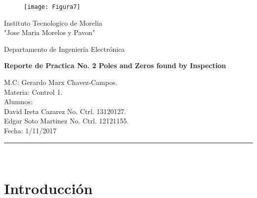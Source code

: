 \documentclass{report}
\newcounter{ns}
\begin{document}
	
	\begin{titlepage}
		
		\begin{center}
			\vspace*{-1in}
			\begin{figure}[htb]
				\begin{center}
					\texttt{[image: Figura7]}
				\end{center}
			\end{figure}
			
		\begin{large}
				Instituto Tecnologico de Morelia\\
				"Jose Maria Morelos y Pavon"\\
		\end{large}
			\vspace*{0.15in}
		\begin{large}
			Departamento de Ingeniería Electrónica\\
		\end{large}
			\vspace*{0.4in}
			
			\begin{Large}
				\textbf{Reporte de Practica No. 2 Poles and Zeros found by Inspection} \\
			\end{Large}
			\vspace*{0.3in}
			\begin{large}
				M.C: Gerardo Marx Chavez-Campos.\\
				Materia: Control 1.\\
				Alumnos:\\
				 		David Ireta Cazarez No. Ctrl. 13120127.\\
						Edgar Soto Martinez No. Ctrl. 12121155.\\
				Fecha: 1/11/2017\\
			\end{large}
			\rule{80mm}{0.1mm}\\
			\vspace*{0.1in}
		\end{center}
		
	\end{titlepage}

	
	\section*{Introducción}
	
\end{document}
